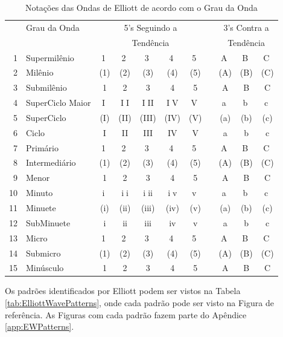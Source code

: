 \documentclass[12pt]{article}
\def\m#1{{\normalsize\textcircled{\scriptsize #1}}}
\begin{document}
\begingroup
\scriptsize
\begin{table}[H]
	\centering
	\caption{Notações das Ondas de Elliott de acordo com o Grau da Onda}
	\label{tab:ElliottWaveDegreeNotations}
\begin{tabular}{rlccccccccc}
   & \multicolumn{1}{l}{Grau da Onda} & \multicolumn{5}{c}{5's Seguindo a} &  & \multicolumn{3}{c}{3's Contra a} \\
   & \multicolumn{1}{c}{} & \multicolumn{5}{c}{Tendência} &  & \multicolumn{3}{c}{Tendência} \\
\toprule
 1 & Supermilênio		& \m{1}	& \m{2}	& \m{3}	& \m{4}	& \m{5}	& & \m{A} & \m{B} & \m{C} \\
 2 & Milênio			& (1)	& (2)	& (3)	& (4)	& (5)	& & (A)	  & (B)	  & (C)	  \\
 3 & Submilênio			& 1		& 2		& 3		& 4		& 5		& & A	  & B	  & C	  \\
\midrule
 4 & SuperCiclo Maior	& \m{I}	&\m{II}	&\m{III}&\m{IV}	& \m{V}	& & \m{a} & \m{b} & \m{c} \\
 5 & SuperCiclo			& (I)	& (II)	& (III)	& (IV)	& (V)	& & (a)	  & (b)	  & (c)	  \\
 6 & Ciclo				& I		& II	& III	& IV	& V		& & a	  & b	  & c	  \\
\midrule
 7 & Primário			& \m{1}	& \m{2}	& \m{3}	& \m{4}	& \m{5}	& & \m{A} & \m{B} & \m{C} \\
 8 & Intermediário		& (1)	& (2)	& (3)	& (4)	& (5)	& & (A)	  & (B)	  & (C)	  \\
 9 & Menor				& 1		& 2		& 3		& 4		& 5		& & A	  & B	  & C	  \\
\midrule
10 & Minuto				& \m{i}	&\m{ii}	&\m{iii}&\m{iv}	& \m{v}	& & \m{a} & \m{b} & \m{c} \\
11 & Minuete			& (i)	& (ii)	& (iii)	& (iv)	& (v)	& & (a)	  & (b)	  & (c)	  \\
12 & SubMinuete			& i		& ii	& iii	& iv	& v		& & a	  & b	  & c	  \\
\midrule
13 & Micro				& \m{1}	& \m{2}	& \m{3}	& \m{4}	& \m{5}	& & \m{A} & \m{B} & \m{C} \\
14 & Submicro			& (1)	& (2)	& (3)	& (4)	& (5)	& & (A)	  & (B)	  & (C)	  \\
15 & Minúsculo			& 1		& 2		& 3		& 4		& 5		& & A	  & B	  & C	  \\
\end{tabular}
\end{table}
\endgroup

Os padrões identificados por Elliott podem ser vistos na Tabela \ref{tab:ElliottWavePatterns},
onde cada padrão pode ser visto na Figura de referência. As Figuras com cada padrão fazem
parte do Apêndice \ref{app:EWPatterns}.
\end{document}
